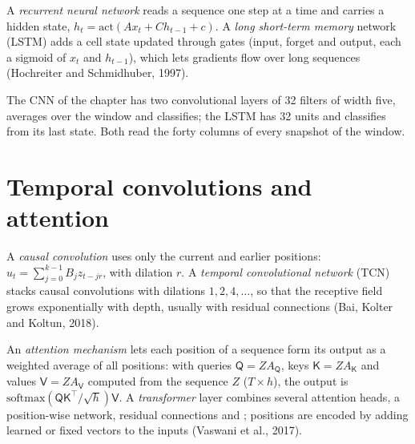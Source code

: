 \begin{definition}\label{def:ml:sequence-models-on-order-books:rnn}
A \emph{recurrent neural network} reads a sequence one step at a time and carries a hidden
state, $h_t = \mathrm{act}(A x_t + C h_{t-1} + c)$. A \emph{long short-term memory} network
(LSTM) adds a cell state updated through gates (input, forget and output, each a sigmoid of $x_t$ and $h_{t-1}$), which
lets gradients flow over long sequences (Hochreiter and Schmidhuber, 1997).
\end{definition}

The CNN of the chapter has two convolutional layers of 32 filters of width five, averages over the window and classifies;
the LSTM has 32 units and classifies from its last state. Both read the forty columns of every snapshot of the window.

\section{Temporal convolutions and attention}

\begin{definition}\label{def:ml:sequence-models-on-order-books:tcn}
A \emph{causal convolution} uses only the current and earlier positions:
$u_t = \sum_{j=0}^{k-1}B_jz_{t - jr}$, with dilation $r$. A \emph{temporal convolutional network} (TCN) stacks causal convolutions with dilations $1, 2, 4,\dots$, so that the receptive field grows
exponentially with depth, usually with residual connections (Bai, Kolter and Koltun, 2018).
\end{definition}

\begin{definition}\label{def:ml:sequence-models-on-order-books:attention}
An \emph{attention mechanism} lets each position of a sequence form its output as a weighted
average of all positions: with queries $\mathsf Q = ZA_{\mathsf Q}$, keys $\mathsf K = ZA_{\mathsf K}$ and values
$\mathsf V = ZA_{\mathsf V}$ computed from the sequence $Z$ ($T\times h$), the output is
$\mathrm{softmax}(\mathsf Q\mathsf K^\top/\sqrt h)\mathsf V$. A \emph{transformer} layer combines
several attention heads, a position-wise network, residual connections and ; positions are encoded
by adding learned or fixed vectors to the inputs (Vaswani et al., 2017).
\end{definition}

